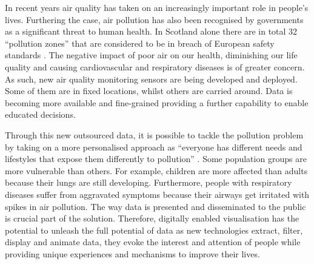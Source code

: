 In recent years air quality has taken on an increasingly important role in people’s lives. Furthering the case, air pollution has also been recognised by governments as a significant threat to human health. In Scotland alone there are in total 32 ``pollution zones'' that are considered to be in breach of European safety standards \cite{Foe-scotland.org.uk} \cite{OKScotland2015}. The negative impact of poor air on our health, diminishing our life quality and causing cardiovascular and respiratory diseases is of greater concern. As such, new air quality monitoring sensors are being developed and deployed. Some of them are in fixed locations, whilst others are carried around. Data is becoming more available and fine-grained providing a further capability to enable educated decisions.

Through this new outsourced data, it is possible to tackle the pollution problem by taking on a  more personalised approach as ``everyone has different needs and lifestyles that expose them differently to pollution'' \cite{Vazquez2016}. Some population groups are more vulnerable than others. For example, children are more affected than adults because their lungs are still developing. Furthermore, people with respiratory diseases suffer from aggravated symptoms because their airways get irritated with spikes in air pollution. The way data is presented and disseminated to the public is crucial part of the solution. Therefore, digitally enabled visualisation has the potential to unleash the full potential of data as new technologies extract, filter, display and animate data, they evoke the interest and attention of people while providing unique experiences and mechanisms to improve their lives.

\iffalse
The effects of air pollution on human health are still complex to understand and there is much research ongoing on the combination short and long term effects upon a person's health. 
\fi